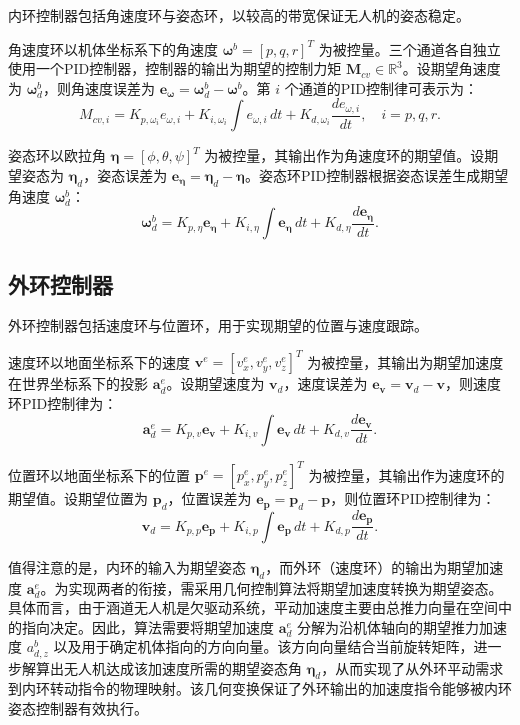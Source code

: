 内环控制器包括角速度环与姿态环，以较高的带宽保证无人机的姿态稳定。

角速度环以机体坐标系下的角速度 \(\bm{\omega}^b = [p, q, r]^T\) 为被控量。三个通道各自独立使用一个PID控制器，控制器的输出为期望的控制力矩 \(\bm{M}_{cv}\in\mathbb{R}^3\)。设期望角速度为 \(\bm{\omega}_d^b\)，则角速度误差为 \(\bm{e}_{\bm{\omega}} = \bm{\omega}_d^b - \bm{\omega}^b\)。第 \(i\) 个通道的PID控制律可表示为：
\[
M_{cv,i} = K_{p,\omega_i} e_{\omega,i} + K_{i,\omega_i} \int e_{\omega,i}\, dt + K_{d,\omega_i} \frac{d e_{\omega,i}}{dt}, \quad i = p,q,r.
\]

姿态环以欧拉角 \(\bm{\eta} = [\phi, \theta, \psi]^T\) 为被控量，其输出作为角速度环的期望值。设期望姿态为 \(\bm{\eta}_d\)，姿态误差为 \(\bm{e}_{\bm{\eta}} = \bm{\eta}_d - \bm{\eta}\)。姿态环PID控制器根据姿态误差生成期望角速度 \(\bm{\omega}_d^b\)：
\[
\bm{\omega}_d^b = K_{p,\eta} \bm{e}_{\bm{\eta}} + K_{i,\eta} \int \bm{e}_{\bm{\eta}}\, dt + K_{d,\eta} \frac{d \bm{e}_{\bm{\eta}}}{dt}.
\]

\subsection{外环控制器}

外环控制器包括速度环与位置环，用于实现期望的位置与速度跟踪。

速度环以地面坐标系下的速度 \(\bm{v}^e = [v_x^e, v_y^e, v_z^e]^T\) 为被控量，其输出为期望加速度在世界坐标系下的投影 \(\bm{a}_d^e\)。设期望速度为 \(\bm{v}_d\)，速度误差为 \(\bm{e}_{\bm{v}} = \bm{v}_d - \bm{v}\)，则速度环PID控制律为：
\[
\bm{a}_d^e = K_{p,v} \bm{e}_{\bm{v}} + K_{i,v} \int \bm{e}_{\bm{v}}\, dt + K_{d,v} \frac{d \bm{e}_{\bm{v}}}{dt}.
\]

位置环以地面坐标系下的位置 \(\bm{p}^e = [p_x^e, p_y^e, p_z^e]^T\) 为被控量，其输出作为速度环的期望值。设期望位置为 \(\bm{p}_d\)，位置误差为 \(\bm{e}_{\bm{p}} = \bm{p}_d - \bm{p}\)，则位置环PID控制律为：
\[
\bm{v}_d = K_{p,p} \bm{e}_{\bm{p}} + K_{i,p} \int \bm{e}_{\bm{p}}\, dt + K_{d,p} \frac{d \bm{e}_{\bm{p}}}{dt}.
\]

值得注意的是，内环的输入为期望姿态 \(\bm{\eta}_d\)，而外环（速度环）的输出为期望加速度 \(\bm{a}_d^e\)。为实现两者的衔接，需采用几何控制算法将期望加速度转换为期望姿态。具体而言，由于涵道无人机是欠驱动系统，平动加速度主要由总推力向量在空间中的指向决定。因此，算法需要将期望加速度 $\bm{a}_d^e$ 分解为沿机体轴向的期望推力加速度 $a_{d,z}^b$ 以及用于确定机体指向的方向向量。该方向向量结合当前旋转矩阵，进一步解算出无人机达成该加速度所需的期望姿态角 $\bm{\eta}_d$，从而实现了从外环平动需求到内环转动指令的物理映射。该几何变换保证了外环输出的加速度指令能够被内环姿态控制器有效执行。

